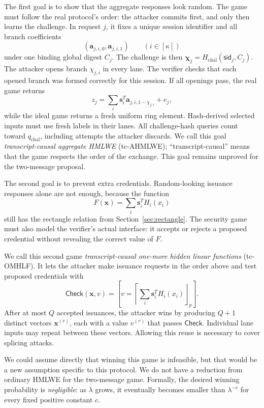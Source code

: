 \documentclass[10pt]{article}
\newcommand{\roundp}[1]{\left\lceil #1\right\rfloor_p}
\begin{document}
The first goal is to show that the aggregate responses look random.  The
game must follow the real protocol's order: the attacker commits first, and
only then learns the challenge.  In request $j$, it fixes a unique session
identifier and all branch coefficients
\[
 (\mathbf a_{j,i,0},\mathbf a_{j,i,1})\qquad(i\in[\kappa])
\]
under one binding global digest $C_j$.  The challenge is then
$\boldsymbol\chi_j=H_{\mathrm{chal}}(\mathsf{sid}_j,C_j)$.
The attacker opens branch $\chi_{j,i}$ in every lane.  The verifier checks
that each opened branch was formed correctly for this session.  If all
openings pass, the real game returns
\[
 z_j=\sum_i\mathbf s_i^T\mathbf a_{j,i,1-\chi_{j,i}}+e_j,
\]
while the ideal game returns a fresh uniform ring element.  Hash-derived
selected inputs must use fresh labels in their lanes.  All challenge-hash
queries count toward $q_{\mathrm{chal}}$, including attempts the attacker
discards.  We call this goal \emph{transcript-causal aggregate HMLWE}
(tc-AHMLWE); ``transcript-causal'' means that the game respects the order of
the exchange.  This goal remains unproved for the two-message proposal.

The second goal is to prevent extra credentials.  Random-looking issuance
responses alone are not enough, because the function
\[
 F(\mathbf x)=\sum_i\mathbf s_i^T H_i(x_i)
\]
still has the rectangle relation from Section~\ref{sec:rectangle}.  The
security game must also model the verifier's actual interface: it accepts or
rejects a proposed credential without revealing the correct value of $F$.

We call this second game \emph{transcript-causal one-more hidden linear
functions} (tc-OMHLF).  It lets the attacker make issuance requests in the
order above and test proposed credentials with
\[
 \mathsf{Check}(\mathbf x,v)=
 \left[v=\roundp{\sum_i\mathbf s_i^T H_i(x_i)}\right].
\]
After at most $Q$ accepted issuances, the attacker wins by producing $Q+1$
distinct vectors $\mathbf x^{(r)}$, each with a value $v^{(r)}$ that passes
$\mathsf{Check}$.  Individual lane inputs may repeat between these vectors.
Allowing this reuse is necessary to cover splicing attacks.

We could assume directly that winning this game is infeasible, but that would
be a new assumption specific to this protocol.  We do not have a reduction
from ordinary HMLWE for the two-message game.  Formally, the desired winning
probability is \emph{negligible}: as $\lambda$ grows, it eventually becomes
smaller than $\lambda^{-c}$ for every fixed positive constant $c$.
\end{document}
